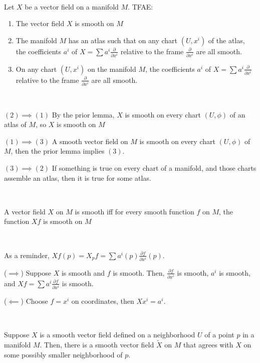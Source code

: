\documentclass{article}
\begin{document}
\begin{proposition}
  \

  Let $X$ be a vector field on a manifold $M$. TFAE:
  \begin{enumerate}
    \item The vector field $X$ is smooth on $M$
    \item The manifold $M$ has an atlas such that on any chart $(U, x^i)$ of the atlas, the coefficients $a^i$ of $X = \sum a^i \frac{\partial}{\partial x^i}$ relative to the frame $\frac{\partial}{\partial x^i}$ are all smooth.
    \item On any chart $(U, x^i)$ on the manifold $M$, the coefficients $a^i$ of $X = \sum a^i \frac{\partial}{\partial x^i}$ relative to the frame $\frac{\partial}{\partial x^i}$ are all smooth.
  \end{enumerate}
\end{proposition}

\begin{customproof}
  \

  $(2) \implies (1)$ By the prior lemma, $X$ is smooth on every chart $(U, \phi)$ of an atlas of $M$, so $X$ is smooth on $M$

  $(1) \implies (3)$ A smooth vector field on $M$ is smooth on every chart $(U,\phi)$ of $M$, then the prior lemma implies $(3)$.

  $(3) \implies (2)$ If something is true on every chart of a manifold, and those charts assemble an atlas, then it is true for some atlas.
\end{customproof}

\begin{proposition}
  \

  A vector field $X$ on $M$ is smooth iff for every smooth function $f$ on $M$, the function $Xf$ is smooth on $M$
\end{proposition}

\begin{customproof}
  \

  As a reminder, $Xf(p) = X_pf = \sum a^i(p) \frac{\partial f}{\partial x^i}(p)$.

  ($\implies$) Suppose $X$ is smooth and $f$ is smooth. Then, $\frac{\partial f}{\partial x^i}$ is smooth, $a^i$ is smooth, and $Xf = \sum a^i \frac{\partial f}{\partial x^i}$ is smooth.

  ($\impliedby$) Choose $f = x^i$ on coordinates, then $X x^i = a^i$.
\end{customproof}

\begin{proposition}
  \

  Suppose $X$ is a smooth vector field defined on a neighborhood $U$ of a point $p$ in a manifold $M$. Then, there is a smooth vector field $\tilde{X}$ on $M$ that agrees with $X$ on some possibly smaller neighborhood of $p$.
\end{proposition}
\end{document}
